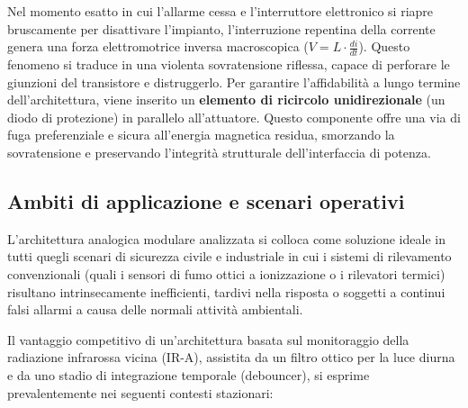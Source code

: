 \documentclass[12pt,a4paper]{article}
\begin{document}
            Nel momento esatto in cui l'allarme cessa e l'interruttore elettronico si riapre bruscamente per disattivare l'impianto, l'interruzione repentina della corrente genera una forza elettromotrice 
            inversa macroscopica ($V = L \cdot \frac{di}{dt}$). Questo fenomeno si traduce in una violenta sovratensione riflessa, capace di perforare le giunzioni del transistore e distruggerlo. Per garantire 
            l'affidabilità a lungo termine dell'architettura, viene inserito un \textbf{elemento di ricircolo unidirezionale} (un diodo di protezione) in parallelo all'attuatore. Questo componente offre una via 
            di fuga preferenziale e sicura all'energia magnetica residua, smorzando la sovratensione e preservando l'integrità strutturale dell'interfaccia di potenza.

    \subsection{Ambiti di applicazione e scenari operativi}
        L'architettura analogica modulare analizzata si colloca come soluzione ideale in tutti quegli scenari di sicurezza civile e industriale in cui i sistemi di rilevamento convenzionali (quali i sensori di fumo 
        ottici a ionizzazione o i rilevatori termici) risultano intrinsecamente inefficienti, tardivi nella risposta o soggetti a continui falsi allarmi a causa delle normali attività ambientali. 

        Il vantaggio competitivo di un'architettura basata sul monitoraggio della radiazione infrarossa vicina (IR-A), assistita da un filtro ottico per la luce diurna e da uno stadio di integrazione temporale 
        (debouncer), si esprime prevalentemente nei seguenti contesti stazionari:
\end{document}

